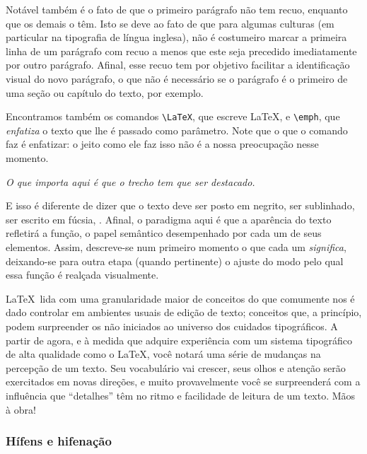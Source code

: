 Notável também é o fato de que o primeiro
parágrafo não tem recuo, enquanto que os
demais o têm. Isto se deve ao fato de que para algumas culturas (em
particular na tipografia de língua inglesa), não é costumeiro marcar a
primeira linha de um parágrafo com recuo a menos que este seja
precedido imediatamente por outro parágrafo. Afinal, esse recuo tem
por objetivo facilitar a identificação visual do novo parágrafo, o que
não é necessário se o parágrafo é o primeiro de uma seção ou capítulo
do texto, por exemplo.

Encontramos também os comandos \verb'\LaTeX', que
escreve \LaTeX, e \verb'\emph', que \emph{enfatiza} o texto que lhe é
passado como parâmetro. Note que o que o comando faz é enfatizar: o
jeito como ele faz isso não é a nossa preocupação nesse momento.

\begin{center}
\it O que importa aqui é que o trecho tem que ser destacado.  
\end{center}

E isso é diferente de dizer que o texto deve ser posto em negrito, ser
sublinhado, ser escrito em fúcsia,  
  . Afinal, o
paradigma aqui é que a aparência do texto refletirá a função, o papel
semântico desempenhado por cada um de seus elementos. Assim,
descreve-se num primeiro momento o que cada um
\emph{significa},
deixando-se para outra etapa (quando pertinente) o ajuste do modo pelo
qual essa função é realçada visualmente.

\LaTeX\ lida com uma granularidade maior de conceitos do que comumente
nos é dado controlar em ambientes usuais de edição de texto; conceitos
que, a princípio, podem surpreender os não iniciados ao universo dos
cuidados tipográficos. A partir de agora, e à medida que adquire
experiência com um sistema tipográfico de alta qualidade como o
\LaTeX, você notará uma série de mudanças na percepção de um texto. Seu
vocabulário vai crescer, seus olhos e atenção serão exercitados em
novas direções, e muito provavelmente você se surpreenderá com a
influência que ``detalhes'' têm no ritmo e facilidade de leitura de um
texto. Mãos à obra!

\subsubsection{Hífens e hifenação}\label{sec:hifenacao}

